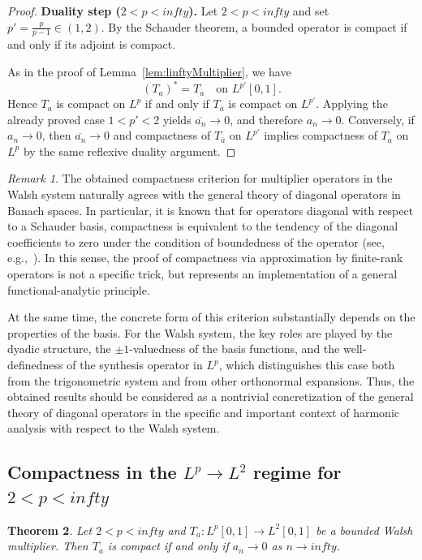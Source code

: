 \documentclass[a4paper,12pt]{article}
\newtheorem{theorem}{Theorem}[section]
\theoremstyle{definition}
\theoremstyle{remark}
\newtheorem{remark}[theorem]{Remark}
\theoremstyle{definition}
\def\infty{infty}%
\begin{document}
\begin{proof}
\medskip
\textbf{Duality step ($2<p<\infty$).}
Let $2<p<\infty$ and set $p'=\frac{p}{p-1}\in(1,2)$.
By the Schauder theorem, a bounded operator is compact if and only if its adjoint is compact.

As in the proof of Lemma~\ref{lem:linftyMultiplier}, we have
\[
(T_a)^* = T_{\overline a}\quad \text{on }L^{p'}[0,1].
\]
Hence $T_a$ is compact on $L^p$ if and only if $T_{\overline a}$ is compact on $L^{p'}$.
Applying the already proved case $1<p'<2$ yields $\overline{a_n}\to0$, and therefore $a_n\to0$.
Conversely, if $a_n\to0$, then $\overline{a_n}\to0$ and compactness of $T_{\overline a}$ on $L^{p'}$
implies compactness of $T_a$ on $L^p$ by the same reflexive duality argument.
\end{proof}
\medskip

\begin{remark}
The obtained compactness criterion
for multiplier operators in the Walsh system
naturally agrees with
the general theory of diagonal operators
in Banach spaces.
In particular, it is known that for operators
diagonal with respect to a Schauder basis,
compactness is equivalent to the tendency
of the diagonal coefficients to zero
under the condition of boundedness of the operator
(see, e.g.,~\cite{LT}).
In this sense, the proof of compactness
via approximation by finite-rank operators
is not a specific trick,
but represents an implementation
of a general functional-analytic principle.

At the same time, the concrete form of this criterion
substantially depends on the properties of the basis.
For the Walsh system, the key roles are played by
the dyadic structure,
the $\pm1$-valuedness of the basis functions,
and the well-definedness of the synthesis operator in $L^p$,
which distinguishes this case
both from the trigonometric system
and from other orthonormal expansions.
Thus, the obtained results
should be considered
as a nontrivial concretization
of the general theory of diagonal operators
in the specific and important context
of harmonic analysis with respect to the Walsh system.
\end{remark}

\subsection{Compactness in the $L^p\to L^2$ regime for $2<p<\infty$}

\begin{theorem}
\label{thm:compactLpL2}
Let $2<p<\infty$ and $T_a:L^p[0,1]\to L^2[0,1]$ be a bounded Walsh multiplier.
Then $T_a$ is compact if and only if $a_n\to 0$ as $n\to\infty$.
\end{theorem}
\end{document}
